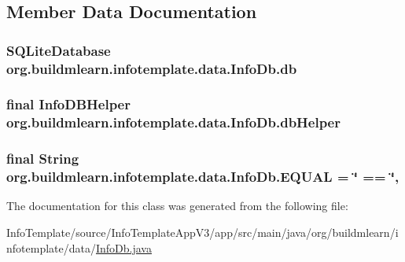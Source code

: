 \subsection{Member Data Documentation}
\subsubsection[{\texorpdfstring{db}{db}}]{\setlength{\rightskip}{0pt plus 5cm}S\+Q\+Lite\+Database org.\+buildmlearn.\+infotemplate.\+data.\+Info\+Db.\+db\hspace{0.3cm}{\ttfamily [private]}}\hypertarget{classorg_1_1buildmlearn_1_1infotemplate_1_1data_1_1InfoDb_a04c6cacb2825eccf5af6d4144c722b04}{}\label{classorg_1_1buildmlearn_1_1infotemplate_1_1data_1_1InfoDb_a04c6cacb2825eccf5af6d4144c722b04}
\subsubsection[{\texorpdfstring{db\+Helper}{dbHelper}}]{\setlength{\rightskip}{0pt plus 5cm}final Info\+D\+B\+Helper org.\+buildmlearn.\+infotemplate.\+data.\+Info\+Db.\+db\+Helper\hspace{0.3cm}{\ttfamily [private]}}\hypertarget{classorg_1_1buildmlearn_1_1infotemplate_1_1data_1_1InfoDb_a648e48d236e5f45787f49d4757f8bab4}{}\label{classorg_1_1buildmlearn_1_1infotemplate_1_1data_1_1InfoDb_a648e48d236e5f45787f49d4757f8bab4}
\subsubsection[{\texorpdfstring{E\+Q\+U\+AL}{EQUAL}}]{\setlength{\rightskip}{0pt plus 5cm}final String org.\+buildmlearn.\+infotemplate.\+data.\+Info\+Db.\+E\+Q\+U\+AL = \char`\"{} == \char`\"{}\hspace{0.3cm}{\ttfamily [static]}, {\ttfamily [private]}}\hypertarget{classorg_1_1buildmlearn_1_1infotemplate_1_1data_1_1InfoDb_a1c646d2a231625792c3c91af4221731c}{}\label{classorg_1_1buildmlearn_1_1infotemplate_1_1data_1_1InfoDb_a1c646d2a231625792c3c91af4221731c}


The documentation for this class was generated from the following file\+:\begin{DoxyCompactItemize}
\item 
Info\+Template/source/\+Info\+Template\+App\+V3/app/src/main/java/org/buildmlearn/infotemplate/data/\hyperlink{InfoDb_8java}{Info\+Db.\+java}\end{DoxyCompactItemize}
